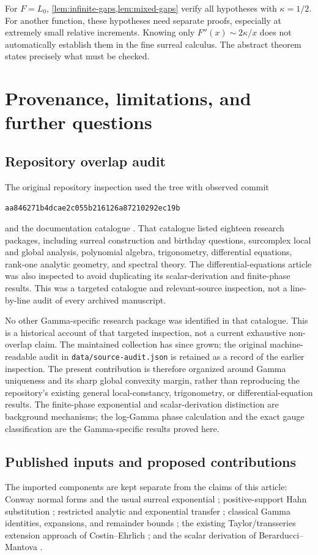 \documentclass[11pt,letterpaper]{article}
\numberwithin{equation}{section}
\theoremstyle{plain}
\theoremstyle{definition}
\theoremstyle{remark}
\newcommand{\commit}{\nolinkurl{aa846271b4dcae2c055b216126a87210292ec19b}}
\begin{document}
For $F=L_0$, \cref{lem:infinite-gaps,lem:mixed-gaps} verify all hypotheses
with $\kappa=1/2$. For another function, these hypotheses need separate
proofs, especially at extremely small relative increments. Knowing only
$F''(x)\sim2\kappa/x$ does not automatically establish them in the fine
surreal calculus. The abstract theorem states precisely what must be checked.

\section{Provenance, limitations, and further questions}\label{sec:provenance}

\subsection{Repository overlap audit}
The original repository inspection used the tree with observed commit
\begin{center}\small\commit\end{center}
and the documentation catalogue \cite{Repo}. That catalogue listed eighteen
research packages, including surreal construction and birthday questions,
surcomplex local and global analysis, polynomial algebra, trigonometry,
differential equations, rank-one analytic geometry, and spectral theory.
The differential-equations article was also inspected to avoid duplicating
its scalar-derivation and finite-phase results. This was a targeted catalogue
and relevant-source inspection, not a line-by-line audit of every archived
manuscript.

No other Gamma-specific research package was identified in that catalogue.
This is a historical account of that targeted inspection, not a current
exhaustive non-overlap claim. The maintained collection has since grown;
the original machine-readable audit in \texttt{data/source-audit.json}
is retained as a record of the earlier inspection.
The present contribution is therefore organized around Gamma uniqueness and
its sharp global convexity margin, rather than reproducing the repository's
existing general local-constancy, trigonometry, or differential-equation
results. The finite-phase exponential and scalar-derivation distinction are
background mechanisms; the log-Gamma phase calculation and the exact gauge
classification are the Gamma-specific results proved here.

\subsection{Published inputs and proposed contributions}
The imported components are kept separate from the claims of this article:
Conway normal forms and the usual surreal exponential
\cite{Conway,Gonshor}; positive-support Hahn substitution
\cite{Neumann}; restricted analytic and exponential transfer
\cite{vdDE}; classical Gamma identities, expansions, and remainder bounds
\cite{DLMF55,DLMF57,DLMF511,DLMF515}; the existing Taylor/transseries
extension approach of Costin--Ehrlich \cite{CE}; and the scalar derivation
of Berarducci--Mantova \cite{BM}.
\end{document}
